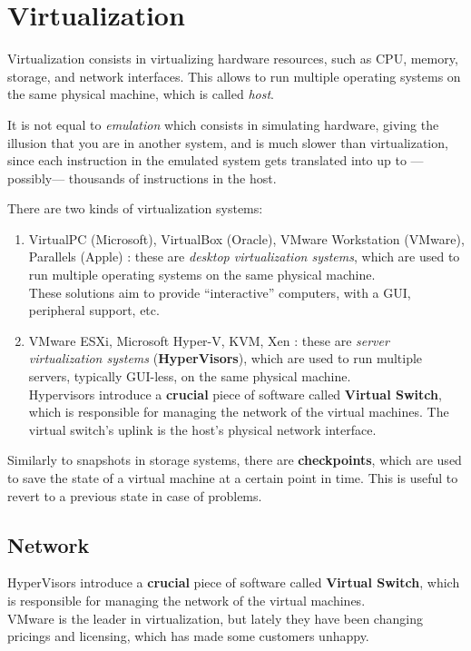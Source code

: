 \chapter{Virtualization}

Virtualization consists in virtualizing hardware resources, such as CPU, memory, storage, and network interfaces. This allows to run multiple operating systems on the same physical machine, which is called \textit{host}.

It is not equal to \textit{emulation} which consists in simulating hardware, giving the illusion that you are in another system, and is much slower than virtualization, since each instruction in the emulated system gets translated into up to ---possibly--- thousands  of instructions in the host.


There are two kinds of virtualization systems:
\begin{enumerate}
   \item VirtualPC (Microsoft), VirtualBox (Oracle), VMware Workstation (VMware), Parallels (Apple) : these are \textit{desktop virtualization systems}, which are used to run multiple operating systems on the same physical machine.\\
   These solutions aim to provide ``interactive'' computers, with a GUI, peripheral support, etc. 
   \item VMware ESXi, Microsoft Hyper-V, KVM, Xen : these are \textit{server virtualization systems} (\textbf{HyperVisors}), which are used to run multiple servers, typically GUI-less, on the same physical machine.\\
   Hypervisors introduce a \textbf{crucial} piece of software called \textbf{Virtual Switch}, which is responsible for managing the network of the virtual machines.
   The virtual switch's uplink is the host's physical network interface.
\end{enumerate}
Similarly to snapshots in storage systems, there are \textbf{checkpoints}, which are used to save the state of a virtual machine at a certain point in time. This is useful to revert to a previous state in case of problems.

\section{Network}
HyperVisors introduce a \textbf{crucial} piece of software called \textbf{Virtual Switch}, which is responsible for managing the network of the virtual machines.\\
VMware is the leader in virtualization, but lately they have been changing pricings and licensing, which has made some customers unhappy.\\

